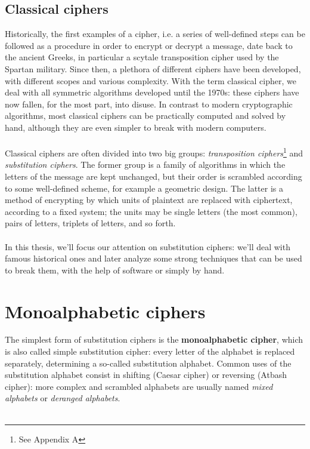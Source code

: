 \documentclass[Lau,binding=0.6cm,oneside]{sapthesis}
\begin{document}
\section{Classical ciphers}
Historically, the first examples of a cipher, i.e. a series of well-defined steps can be followed as a procedure in order to encrypt or decrypt a message, date back to the ancient Greeks, in particular a scytale transposition cipher used by the Spartan military. Since then, a plethora of different ciphers have been developed, with different scopes and various complexity. With the term classical cipher, we deal with all symmetric algorithms developed until the 1970s: these ciphers have now fallen, for the most part, into disuse. In contrast to modern cryptographic algorithms, most classical ciphers can be practically computed and solved by hand, although they are even simpler to break with modern computers.\\\\
Classical ciphers are often divided into two big groups: \textit{transposition ciphers}\footnote[1]{See Appendix A} and \textit{substitution ciphers}. The former group is a family of algorithms in which the letters of the message are kept unchanged, but their order is scrambled according to some well-defined scheme, for example a geometric design. The latter is a method of encrypting by which units of plaintext are replaced with ciphertext, according to a fixed system; the units may be single letters (the most common), pairs of letters, triplets of letters, and so forth.\\\\
In this thesis, we'll focus our attention on substitution ciphers: we'll deal with famous historical ones and later analyze some strong techniques that can be used to break them, with the help of software or simply by hand.

\chapter{Monoalphabetic ciphers}
The simplest form of substitution ciphers is the \textbf{monoalphabetic cipher}, which is also called simple substitution cipher: every letter of the alphabet is replaced separately, determining a so-called substitution alphabet. Common uses of the substitution alphabet consist in shifting (Caesar cipher) or reversing (Atbash cipher): more complex and scrambled alphabets are usually named \textit{mixed alphabets} or \textit{deranged alphabets}.\\\\
\end{document}
